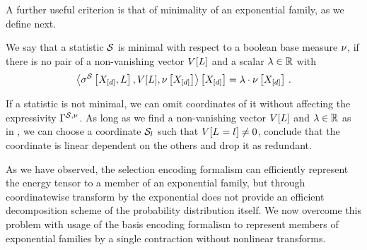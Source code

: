 A further useful criterion is that of minimality of an exponential family, as we define next.

\begin{definition}[Minimal]
    \label{def:minimalStatistics}
    We say that a statistic $\mathcal{S}$ is minimal with respect to a boolean base measure $\nu$, if there is no pair of a non-vanishing vector $V[L]$ and a scalar $\lambda\in\mathbb{R}$ with
    \begin{align*}
        \left\langle \sigma^{\mathcal{S}}\left[X_{[d]},L\right],V[L],\nu\left[X_{[d]}\right]\right\rangle \left[ X_{[d]} \right] = \lambda\cdot\nu\left[X_{[d]}\right] \, .
    \end{align*}
\end{definition}

If a statistic is not minimal, we can omit coordinates of it without affecting the expressivity $\Gamma^{\mathcal{S},\nu}$.
As long as we find a non-vanishing vector $V[L]$ and $\lambda\in\mathbb{R}$ as in , we can choose a coordinate $\mathcal{S}_{l}$ such that $V[L_{}=l_{}]\neq0$, conclude that the coordinate is linear dependent on the others and drop it as redundant.



As we have observed, the selection encoding formalism can efficiently represent the energy tensor to a member of an exponential family, but through coordinatewise transform by the exponential does not provide an efficient decomposition scheme of the probability distribution itself.
We now overcome this problem with usage of the basis encoding formalism to represent members of exponential families by a single contraction without nonlinear transforms.

